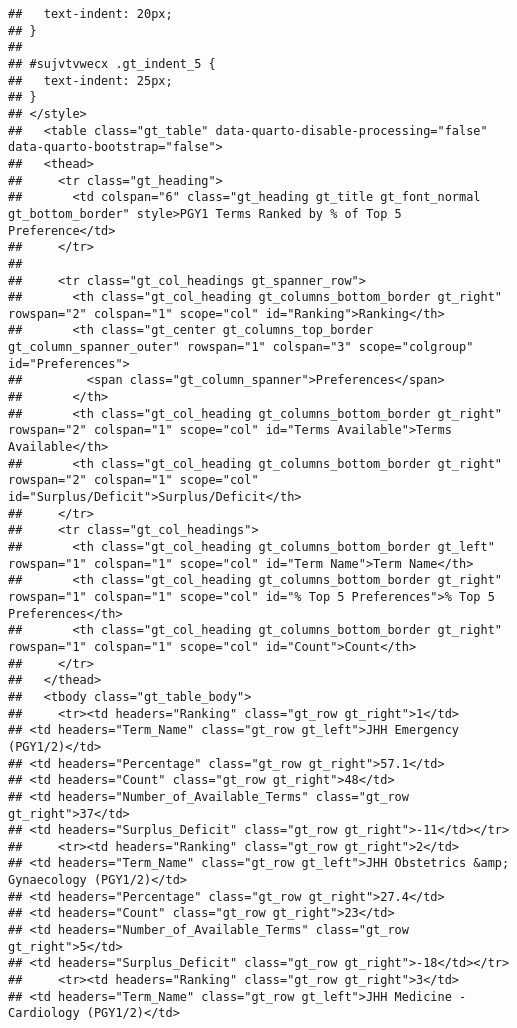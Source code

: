 \documentclass[
]{article}
\begin{document}
\begin{verbatim}
##   text-indent: 20px;
## }
## 
## #sujvtvwecx .gt_indent_5 {
##   text-indent: 25px;
## }
## </style>
##   <table class="gt_table" data-quarto-disable-processing="false" data-quarto-bootstrap="false">
##   <thead>
##     <tr class="gt_heading">
##       <td colspan="6" class="gt_heading gt_title gt_font_normal gt_bottom_border" style>PGY1 Terms Ranked by % of Top 5 Preference</td>
##     </tr>
##     
##     <tr class="gt_col_headings gt_spanner_row">
##       <th class="gt_col_heading gt_columns_bottom_border gt_right" rowspan="2" colspan="1" scope="col" id="Ranking">Ranking</th>
##       <th class="gt_center gt_columns_top_border gt_column_spanner_outer" rowspan="1" colspan="3" scope="colgroup" id="Preferences">
##         <span class="gt_column_spanner">Preferences</span>
##       </th>
##       <th class="gt_col_heading gt_columns_bottom_border gt_right" rowspan="2" colspan="1" scope="col" id="Terms Available">Terms Available</th>
##       <th class="gt_col_heading gt_columns_bottom_border gt_right" rowspan="2" colspan="1" scope="col" id="Surplus/Deficit">Surplus/Deficit</th>
##     </tr>
##     <tr class="gt_col_headings">
##       <th class="gt_col_heading gt_columns_bottom_border gt_left" rowspan="1" colspan="1" scope="col" id="Term Name">Term Name</th>
##       <th class="gt_col_heading gt_columns_bottom_border gt_right" rowspan="1" colspan="1" scope="col" id="% Top 5 Preferences">% Top 5 Preferences</th>
##       <th class="gt_col_heading gt_columns_bottom_border gt_right" rowspan="1" colspan="1" scope="col" id="Count">Count</th>
##     </tr>
##   </thead>
##   <tbody class="gt_table_body">
##     <tr><td headers="Ranking" class="gt_row gt_right">1</td>
## <td headers="Term_Name" class="gt_row gt_left">JHH Emergency (PGY1/2)</td>
## <td headers="Percentage" class="gt_row gt_right">57.1</td>
## <td headers="Count" class="gt_row gt_right">48</td>
## <td headers="Number_of_Available_Terms" class="gt_row gt_right">37</td>
## <td headers="Surplus_Deficit" class="gt_row gt_right">-11</td></tr>
##     <tr><td headers="Ranking" class="gt_row gt_right">2</td>
## <td headers="Term_Name" class="gt_row gt_left">JHH Obstetrics &amp; Gynaecology (PGY1/2)</td>
## <td headers="Percentage" class="gt_row gt_right">27.4</td>
## <td headers="Count" class="gt_row gt_right">23</td>
## <td headers="Number_of_Available_Terms" class="gt_row gt_right">5</td>
## <td headers="Surplus_Deficit" class="gt_row gt_right">-18</td></tr>
##     <tr><td headers="Ranking" class="gt_row gt_right">3</td>
## <td headers="Term_Name" class="gt_row gt_left">JHH Medicine - Cardiology (PGY1/2)</td>

\end{verbatim}
\end{document}
